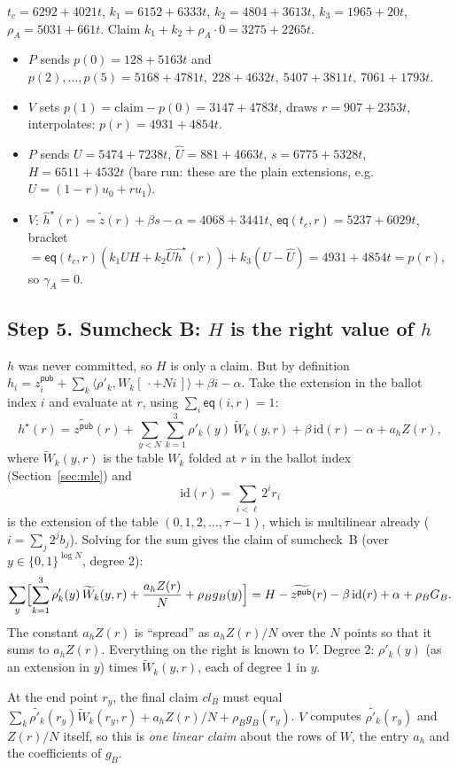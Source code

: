 \documentclass[11pt,a4paper]{article}
\newcommand{\cube}[1]{\{0,1\}^{#1}}
\newcommand{\eq}{\mathsf{eq}}
\newcommand{\ip}[2]{\langle #1, #2\rangle}
\newcommand{\mle}[1]{\widetilde{#1}}
\newcommand{\msk}[1]{#1^{\star}}
\newcommand{\hh}{\hat{h}}
\newcommand{\zh}{\hat{z}}
\newcommand{\zpub}{z^{\mathsf{pub}}}
\newcommand{\id}{\mathrm{id}}
\theoremstyle{definition}
\theoremstyle{plain}
\begin{document}
\begin{toyrun}[Sumcheck A, one round ($\ell=1$, so the first round is the last: degree 5)]
$t_c=6292{+}4021t$, $k_1=6152{+}6333t$, $k_2=4804{+}3613t$, $k_3=1965{+}20t$, $\rho_A=5031{+}661t$.
Claim $k_1+k_2+\rho_A\cdot 0=3275{+}2265t$.
\begin{itemize}[leftmargin=1.2em]
\item $P$ sends $p(0)=128{+}5163t$ and $p(2),\dots,p(5)=5168{+}4781t,\ 228{+}4632t,\ 5407{+}3811t,\ 7061{+}1793t$.
\item $V$ sets $p(1)=\text{claim}-p(0)=3147{+}4783t$, draws $r=907{+}2353t$, interpolates: $p(r)=4931{+}4854t$.
\item $P$ sends $U=5474{+}7238t$, $\hat U=881{+}4663t$, $s=6775{+}5328t$, $H=6511{+}4532t$
  (bare run: these are the plain extensions, e.g.\ $U=(1-r)u_0+ru_1$).
\item $V$: $\msk\hh(r)=\mle\zh(r)+\beta s-\alpha=4068{+}3441t$, $\eq(t_c,r)=5237{+}6029t$,
  bracket $=\eq(t_c,r)(k_1UH+k_2\hat U\msk\hh(r))+k_3(U-\hat U)=4931{+}4854t=p(r)$, so $\gamma_A=0$.
\end{itemize}
\end{toyrun}

\subsection*{Step 5. Sumcheck B: $H$ is the right value of $h$}

$h$ was never committed, so $H$ is only a claim. But by definition
$h_i=\zpub_i+\sum_k\ip{\rho'_k}{W_k[\,\cdot+Ni\,]}+\beta i-\alpha$. Take the extension in the ballot index
$i$ and evaluate at $r$, using $\sum_i\eq(i,r)=1$:
\[
  \msk h(r)=\mle{\zpub}(r)+\sum_{y<N}\sum_{k=1}^3\rho'_k(y)\,\mle W_k(y,r)+\beta\,\id(r)-\alpha+a_hZ(r),
\]
where $\mle W_k(y,r)$ is the table $W_k$ folded at $r$ in the ballot index (Section~\ref{sec:mle}) and
\[
  \id(r)=\sum_{i<\ell}2^ir_i
\]
is the extension of the table $(0,1,2,\dots,\tau-1)$, which is multilinear already ($i=\sum_j2^jb_j$).
Solving for the sum gives the claim of sumcheck~B (over $y\in\cube{\log N}$, degree 2):
\[
  \sum_y\Bigl[\sum_{k=1}^3\rho'_k(y)\,\mle W_k(y,r)+\frac{a_hZ(r)}{N}+\rho_Bg_B(y)\Bigr]
  =H-\mle{\zpub}(r)-\beta\,\id(r)+\alpha+\rho_BG_B .
\]
The constant $a_hZ(r)$ is ``spread'' as $a_hZ(r)/N$ over the $N$ points so that it sums to $a_hZ(r)$.
Everything on the right is known to $V$. Degree 2: $\rho'_k(y)$ (as an extension in $y$) times
$\mle W_k(y,r)$, each of degree 1 in $y$.

At the end point $r_y$, the final claim $\mathit{cl}_B$ must equal
$\sum_k\mle{\rho'_k}(r_y)\mle W_k(r_y,r)+a_hZ(r)/N+\rho_Bg_B(r_y)$. $V$ computes $\mle{\rho'_k}(r_y)$ and
$Z(r)/N$ itself, so this is \emph{one linear claim} about the rows of $W$, the entry $a_h$ and the
coefficients of $g_B$.
\end{document}
